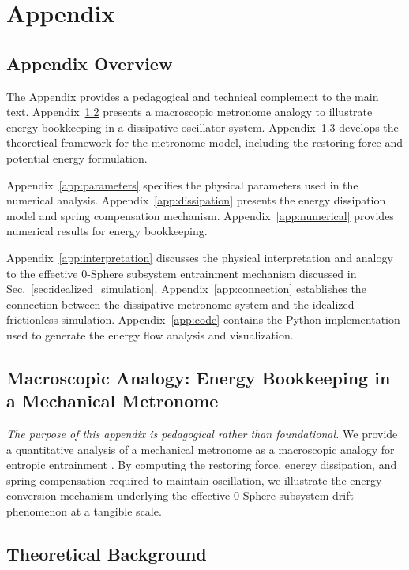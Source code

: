 \documentclass[
 reprint,
 amsmath,amssymb,
 aps,
 prb,
]{revtex4-2}
\numberwithin{equation}{section}
\begin{document}
\section{Appendix}

\subsection{Appendix Overview}
The Appendix provides a pedagogical and technical complement to the main text. Appendix~\ref{app:metronome} presents a macroscopic metronome analogy to illustrate energy bookkeeping in a dissipative oscillator system. Appendix~\ref{app:theory_background} develops the theoretical framework for the metronome model, including the restoring force and potential energy formulation.

Appendix~\ref{app:parameters} specifies the physical parameters used in the numerical analysis. Appendix~\ref{app:dissipation} presents the energy dissipation model and spring compensation mechanism. Appendix~\ref{app:numerical} provides numerical results for energy bookkeeping.

Appendix~\ref{app:interpretation} discusses the physical interpretation and analogy to the effective 0-Sphere subsystem entrainment mechanism discussed in Sec.~\ref{sec:idealized_simulation}. Appendix~\ref{app:connection} establishes the connection between the dissipative metronome system and the idealized frictionless simulation. Appendix~\ref{app:code} contains the Python implementation used to generate the energy flow analysis and visualization.

\subsection{Macroscopic Analogy: Energy Bookkeeping in a Mechanical Metronome}
\label{app:metronome}

\textit{The purpose of this appendix is pedagogical rather than foundational.} We provide a quantitative analysis of a mechanical metronome as a macroscopic analogy for entropic entrainment \cite{Bennett2002}. By computing the restoring force, energy dissipation, and spring compensation required to maintain oscillation, we illustrate the energy conversion mechanism underlying the effective 0-Sphere subsystem drift phenomenon at a tangible scale.

\subsection{Theoretical Background}
\label{app:theory_background}
\end{document}

